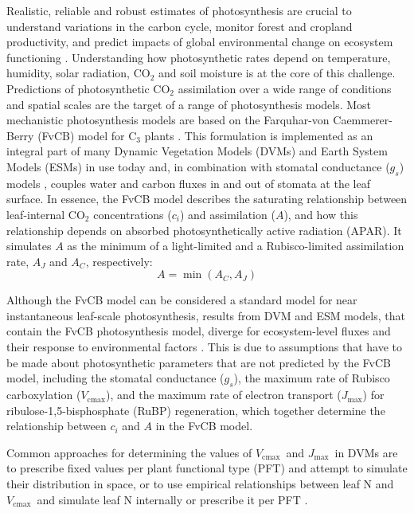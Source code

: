 \documentclass{myreport}
\newcommand{\vcmax}{$V_{\text{cmax}}$}
\newcommand{\jmax}{$J_{\text{max}}$}
\begin{document}
Realistic, reliable and robust estimates of photosynthesis are crucial to understand variations in the carbon cycle, monitor forest and cropland productivity, and predict impacts of global environmental change on ecosystem functioning \citep{prentice15}. Understanding how photosynthetic rates depend on temperature, humidity, solar radiation, CO$_2$ and soil moisture is at the core of this challenge. Predictions of photosynthetic CO$_2$ assimilation over a wide range of conditions and spatial scales are the target of a range of photosynthesis models. Most mechanistic photosynthesis models are based on the Farquhar-von Caemmerer-Berry (FvCB) model for C$_3$ plants \citep{farquhar80, voncaemmerer81}. This formulation is implemented as an integral part of many Dynamic Vegetation Models (DVMs) and Earth System Models (ESMs) in use today \citep{rogers17} and, in combination with stomatal conductance ($g_s$) models \citep{ball87, leuning95pce, medlyn11gcb}, couples water and carbon fluxes in and out of stomata at the leaf surface. In essence, the FvCB model describes the saturating relationship between leaf-internal CO$_2$ concentrations ($c_i$) and assimilation ($A$), and how this relationship depends on absorbed photosynthetically active radiation (APAR). It simulates $A$ as the minimum of a light-limited and a Rubisco-limited assimilation rate, $A_J$ and $A_C$, respectively:
\begin{equation}
    A = \min(A_C, A_J)
\end{equation}

Although the FvCB model can be considered a standard model for near instantaneous leaf-scale photosynthesis, results from DVM and ESM models, that contain the FvCB photosynthesis model, diverge for ecosystem-level fluxes and their response to environmental factors \citep{rogers17}. This is due to assumptions that have to be made about photosynthetic parameters that are not predicted by the FvCB model, including the stomatal conductance ($g_s$), the maximum rate of Rubisco carboxylation (\vcmax ), and the maximum rate of electron transport (\jmax ) for ribulose-1,5-bisphosphate (RuBP) regeneration, which together determine the relationship between $c_i$ and $A$ in the FvCB model. 

Common approaches for determining the values of \vcmax\ and \jmax\ in DVMs are to prescribe fixed values per plant functional type (PFT) and attempt to simulate their distribution in space, or to use empirical relationships between leaf N and \vcmax\ and simulate leaf N internally or prescribe it per PFT \citep{smithdukes13gcb, rogers14}. 
\end{document}

